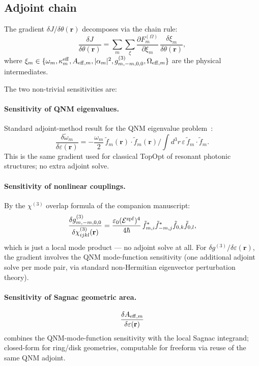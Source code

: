 \documentclass[11pt]{article}
\newcommand{\zpf}{{\rm zpf}}
\newcommand{\eff}{{\rm eff}}
\newcommand{\tomega}{\tilde{\omega}}
\begin{document}
\subsection{Adjoint chain}

The gradient $\delta J/\delta \theta(\mathbf{r})$ decomposes via the
chain rule:
\begin{equation}
  \frac{\delta J}{\delta\theta(\mathbf{r})} = \sum_m \sum_{\xi}
  \frac{\partial F_m^{(\Omega)}}{\partial\xi_m}\,
  \frac{\delta\xi_m}{\delta\theta(\mathbf{r})},
  \label{eq:chain}
\end{equation}
where $\xi_m \in\{\omega_m,\kappa_m^\eff,A_{\eff,m},|\alpha_m|^2,
g^{(3)}_{m,-m,0,0},\Omega_{\eff,m}\}$ are the physical intermediates.

The two non-trivial sensitivities are:

\paragraph{Sensitivity of QNM eigenvalues.}  Standard adjoint-method
result for the QNM eigenvalue problem~\cite{Sigmund2011,Hammond2022}:
\begin{equation}
  \frac{\delta\tomega_m}{\delta\varepsilon(\mathbf{r})}
  = -\frac{\omega_m}{2}\,\tilde f_m(\mathbf{r})\cdot\tilde f_m(\mathbf{r})
  / \int d^3r\,\varepsilon\,\tilde f_m\cdot\tilde f_m.
\end{equation}
This is the same gradient used for classical TopOpt of resonant
photonic structures; no extra adjoint solve.

\paragraph{Sensitivity of nonlinear couplings.}  By
the $\chi^{(3)}$ overlap formula of the companion manuscript:
\begin{equation}
  \frac{\delta g^{(3)}_{m,-m,0,0}}{\delta\chi^{(3)}_{ijkl}(\mathbf{r})}
  = \frac{\varepsilon_0(\mathcal{E}^\zpf)^4}{4\hbar}\,
    \tilde f^*_{m,i}\tilde f^*_{-m,j}\tilde f_{0,k}\tilde f_{0,l},
\end{equation}
which is just a local mode product --- no adjoint solve at all.  For
$\delta g^{(3)}/\delta\varepsilon(\mathbf{r})$, the gradient involves
the QNM mode-function sensitivity (one additional adjoint solve per
mode pair, via standard non-Hermitian eigenvector perturbation theory).

\paragraph{Sensitivity of Sagnac geometric area.}
\begin{equation}
  \frac{\delta A_{\eff,m}}{\delta\varepsilon(\mathbf{r})}
\end{equation}
combines the QNM-mode-function sensitivity with the local Sagnac
integrand; closed-form for ring/disk geometries, computable for
freeform via reuse of the same QNM adjoint.
\end{document}
